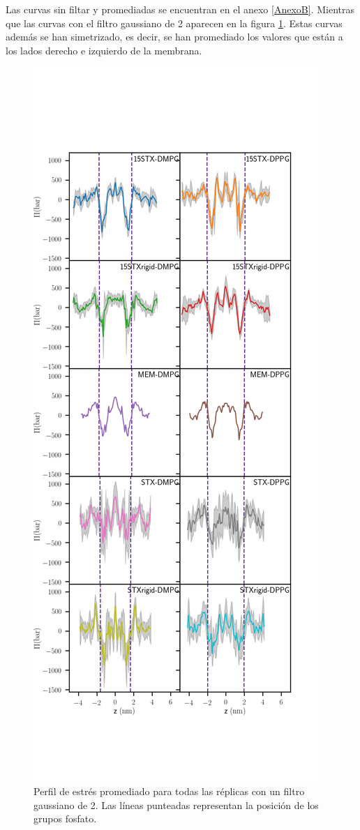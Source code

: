 Las curvas sin filtar y promediadas se encuentran en el anexo \ref{AnexoB}. Mientras que las curvas con el filtro gaussiano de 2 aparecen en la figura \ref{fig:stress2}. Estas curvas adem\'{a}s se han simetrizado, es decir, se han promediado los valores que est\'{a}n a los lados derecho e izquierdo de la membrana.\\
\begin{figure}
\begin{center}
    \includegraphics[scale=0.25,trim={0 6cm 0 9cm},clip]{Plots/stress_profile_2_sym.png}
  \caption{Perfil de estr\'{e}s promediado para todas las r\'{e}plicas con un filtro gaussiano de 2. Las l\'{i}neas punteadas representan la posici\'{o}n de los grupos fosfato. }
  \label{fig:stress2}
\end{center}
\end{figure}
